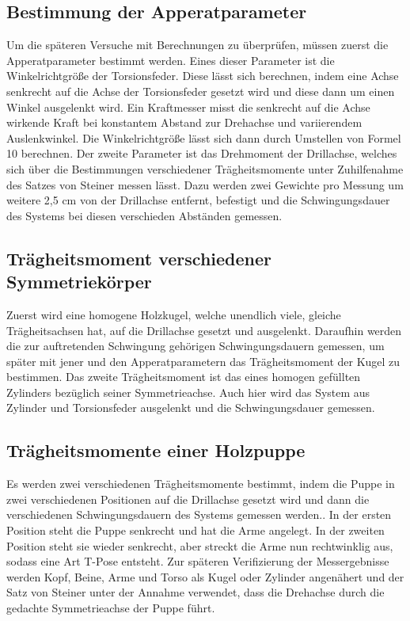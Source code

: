 \documentclass[titlepage = firstcover]{scrartcl}
\begin{document}
      \subsection{Bestimmung der Apperatparameter}
      Um die späteren Versuche mit Berechnungen zu überprüfen, müssen zuerst die Apperatparameter bestimmt werden. Eines dieser Parameter ist die Winkelrichtgröße 
      der Torsionsfeder. Diese lässt sich berechnen, indem eine Achse senkrecht auf die Achse der Torsionsfeder gesetzt wird und diese dann um einen Winkel
      ausgelenkt wird. Ein Kraftmesser misst die senkrecht auf die Achse wirkende Kraft bei konstantem Abstand zur Drehachse und variierendem Auslenkwinkel. Die 
      Winkelrichtgröße lässt sich dann durch Umstellen von Formel 10 berechnen. Der zweite Parameter ist das Drehmoment der Drillachse, welches sich über 
      die Bestimmungen verschiedener Trägheitsmomente unter Zuhilfenahme des Satzes von Steiner messen lässt. Dazu werden zwei Gewichte pro Messung um weitere 2,5 cm von 
      der  Drillachse entfernt, befestigt und die Schwingungsdauer des Systems bei diesen verschieden Abständen gemessen.

      \subsection{Trägheitsmoment verschiedener Symmetriekörper}
      Zuerst wird eine homogene Holzkugel, welche unendlich viele, gleiche Trägheitsachsen hat, auf die Drillachse gesetzt und ausgelenkt. Daraufhin werden die 
      zur auftretenden Schwingung gehörigen Schwingungsdauern gemessen, um später mit jener und den Apperatparametern das Trägheitsmoment der Kugel zu bestimmen.
      Das zweite Trägheitsmoment ist das eines homogen gefüllten Zylinders bezüglich seiner Symmetrieachse. Auch hier wird das System aus Zylinder und Torsionsfeder
      ausgelenkt und die Schwingungsdauer gemessen.

      \subsection{Trägheitsmomente einer Holzpuppe}
      Es werden zwei verschiedenen Trägheitsmomente bestimmt, indem die Puppe in zwei verschiedenen Positionen auf die Drillachse gesetzt wird und dann die verschiedenen
      Schwingungsdauern des Systems gemessen werden.. In der ersten Position steht die Puppe senkrecht und hat die Arme angelegt. In der zweiten Position steht sie wieder 
      senkrecht, aber streckt die Arme nun rechtwinklig aus, sodass eine Art T-Pose entsteht. Zur späteren Verifizierung der Messergebnisse werden Kopf, Beine, Arme
      und Torso als Kugel oder Zylinder angenähert und der Satz von Steiner unter der Annahme verwendet, dass die Drehachse durch die gedachte Symmetrieachse der
      Puppe führt.
\end{document}
